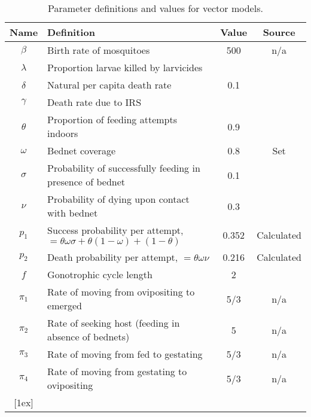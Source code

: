\begin{table*}[t]
\caption{Parameter definitions and values for vector models.}%
\vspace{.1cm}
\centering %
\begin{tabular}{c l c c}%
\hline\hline                        %
Name & Definition & Value & Source \\ [0.5ex]%
\hline                  %
$\beta$ & Birth rate of mosquitoes & 500 & n/a \\%
$\lambda$ & Proportion larvae killed by larvicides & & \\
$\delta$ & Natural per capita death rate & 0.1 & \cite{le2007} \\
$\gamma$ & Death rate due to IRS & & \\
$\theta$ & Proportion of feeding attempts indoors & 0.9 & \cite{le2007} \\
$\omega$ & Bednet coverage & 0.8 & Set \\
$\sigma$ & Probability of successfully feeding in presence of bednet & 0.1 & \cite{le2007} \\
$\nu$ & Probability of dying upon contact with bednet & 0.3 & \cite{le2007} \\
$p_1$ & Success probability per attempt, $= \theta\omega\sigma+\theta(1-\omega)+(1-\theta)$ & 0.352 & Calculated \\
$p_2$ & Death probability per attempt, $= \theta\omega\nu$ & 0.216 & Calculated \\
$f$ & Gonotrophic cycle length & 2 & \cite{quinones1997}  \\
$\pi_1$ & Rate of moving from ovipositing to emerged & 5/3 & n/a  \\
$\pi_2$ & Rate of seeking host (feeding in absence of bednets) & 5 & n/a  \\
$\pi_3$ & Rate of moving from fed to gestating & 5/3 & n/a  \\ 
$\pi_4$ & Rate of moving from gestating to ovipositing & 5/3 & n/a \\
[1ex]      %
\hline%
\end{tabular}
\label{table:param}%
\end{table*}


